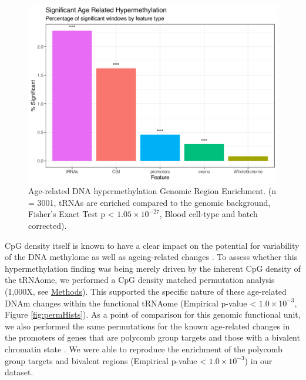 \documentclass[
]{book}
\begin{document}
\begin{figure}

{\centering \includegraphics[width=0.9\linewidth]{./figs/nSigWinProps_WGfishers_BB_sws_hyper_2_BL_noPolyBivExcl_BarTxtast_sr} 

}

\caption{Age-related DNA hypermethylation Genomic Region Enrichment. (n = 3001, tRNAs are enriched compared to the genomic background, Fisher's Exact Test p \textless{} \(1.05\times10^{-27}\), Blood cell-type and batch corrected).}\label{fig:sizePropEnrich}
\end{figure}



CpG density itself is known to have a clear impact on the potential for variability of the DNA methylome as well as ageing-related changes \citep{Ziller2013, Christensen2009}.
To assess whether this hypermethylation finding was being merely driven by the inherent CpG density of the tRNAome, we performed a CpG density matched permutation analysis (1,000X, see \protect\hyperlink{AgeErichmentPermutation}{Methods}).
This supported the specific nature of these age-related DNAm changes within the functional tRNAome (Empirical p-value \textless{} \(1.0\times10^{-3}\), Figure \ref{fig:permHists}).
As a point of comparison for this genomic functional unit, we also performed the same permutations for the known age-related changes in the promoters of genes that are polycomb group targets \citep{Teschendorff2010} and those with a bivalent chromatin state \citep{Rakyan2010}.
We were able to reproduce the enrichment of the polycomb group targets and bivalent regions (Empirical p-value \textless{} \(1.0\times10^{-3}\)) in our dataset.
\end{document}

